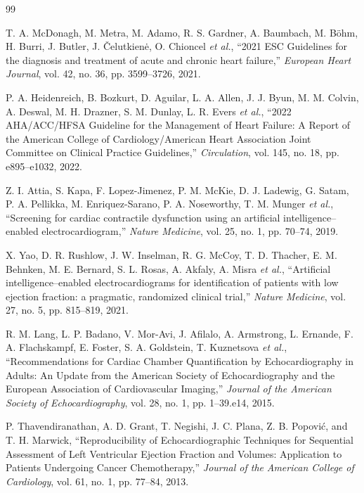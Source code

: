 \begin{thebibliography}{99}

 T. A. McDonagh, M. Metra, M. Adamo, R. S. Gardner, A. Baumbach, M. B\"ohm, H. Burri, J. Butler, J. Čelutkienė, O. Chioncel \emph{et al.}, ``2021 ESC Guidelines for the diagnosis and treatment of acute and chronic heart failure,'' \emph{European Heart Journal}, vol. 42, no. 36, pp. 3599--3726, 2021.

 P. A. Heidenreich, B. Bozkurt, D. Aguilar, L. A. Allen, J. J. Byun, M. M. Colvin, A. Deswal, M. H. Drazner, S. M. Dunlay, L. R. Evers \emph{et al.}, ``2022 AHA/ACC/HFSA Guideline for the Management of Heart Failure: A Report of the American College of Cardiology/American Heart Association Joint Committee on Clinical Practice Guidelines,'' \emph{Circulation}, vol. 145, no. 18, pp. e895--e1032, 2022.

 Z. I. Attia, S. Kapa, F. Lopez-Jimenez, P. M. McKie, D. J. Ladewig, G. Satam, P. A. Pellikka, M. Enriquez-Sarano, P. A. Noseworthy, T. M. Munger \emph{et al.}, ``Screening for cardiac contractile dysfunction using an artificial intelligence--enabled electrocardiogram,'' \emph{Nature Medicine}, vol. 25, no. 1, pp. 70--74, 2019.

 X. Yao, D. R. Rushlow, J. W. Inselman, R. G. McCoy, T. D. Thacher, E. M. Behnken, M. E. Bernard, S. L. Rosas, A. Akfaly, A. Misra \emph{et al.}, ``Artificial intelligence--enabled electrocardiograms for identification of patients with low ejection fraction: a pragmatic, randomized clinical trial,'' \emph{Nature} \emph{Medicine}, vol. 27, no. 5, pp. 815--819, 2021.

 R. M. Lang, L. P. Badano, V. Mor-Avi, J. Afilalo, A. Armstrong, L. Ernande, F. A. Flachskampf, E. Foster, S. A. Goldstein, T. Kuznetsova \emph{et al.}, ``Recommendations for Cardiac Chamber Quantification by Echocardiography in Adults: An Update from the American Society of Echocardiography and the European Association of Cardiovascular Imaging,'' \emph{Journal of the American Society of} \emph{Echocardiography}, vol. 28, no. 1, pp. 1--39.e14, 2015.

 P. Thavendiranathan, A. D. Grant, T. Negishi, J. C. Plana, Z. B. Popović, and T. H. Marwick, ``Reproducibility of Echocardiographic Techniques for Sequential Assessment of Left Ventricular Ejection Fraction and Volumes: Application to Patients Undergoing Cancer Chemotherapy,'' \emph{Journal of the} \emph{American College of Cardiology}, vol. 61, no. 1, pp. 77--84, 2013.


\end{thebibliography}
